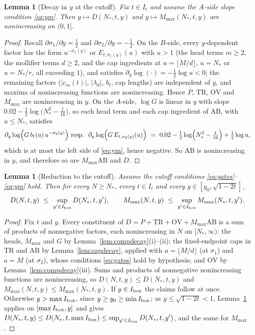 \documentclass[11pt]{article}
\newtheorem{lemma}[theorem]{Lemma}
\theoremstyle{definition}
\begin{document}
\begin{lemma}[Decay in $y$ at the cutoff]\label{lem:ydecay}
Fix $t\in I_t$ and assume the $A$-side slope condition
\eqref{eq:ym}. Then $y\mapsto D(N_*,t,y)$ and
$y\mapsto M_{\max}(N_*,t,y)$ are nonincreasing on $(0,1]$.
\end{lemma}

\begin{proof}
Recall $\partial\sigma_1/\partial y=\frac12$ and
$\partial\sigma_2/\partial y=-\frac12$. On the $B$-side, every
$y$-dependent factor has the form $u^{-\sigma_1(y)}$ or
$E_{t,\sigma_1(y)}(u)$ with $u>1$ (the head terms $m\ge2$, the
mollifier terms $d\ge2$, and the cap ingredients at
$u=\lfloor M/d\rfloor$, $u=N_*$ or $u=N_*/r$, all exceeding $1$),
and satisfies $\partial_y\log(\cdot)=-\frac12\log u<0$; the
remaining factors ($|c_m(t)|$, $|\lambda_d|$, $b_t$, cap lengths)
are independent of $y$, and maxima of nonincreasing functions are
nonincreasing. Hence $P$, $\mathrm{TR}$, $\mathrm{OV}$ and
$M_{\max}$ are nonincreasing in $y$. On the $A$-side, $\log G$ is
linear in $y$ with slope
$0.02-\frac12\log\bigl(N_*^2-\frac t{16}\bigr)$, so each head
term and each cap ingredient of $\mathrm{AB}$, with $u\le N_*$,
satisfies
\[
\partial_y\log\Bigl(G\,b_t(u)\,u^{-\sigma_2(y)}\Bigr)
\ \text{resp.}\ \
\partial_y\log\Bigl(G\,E_{t,\sigma_2(y)}(u)\Bigr)
\ =\ 0.02-\tfrac12\log\Bigl(N_*^2-\tfrac t{16}\Bigr)
+\tfrac12\log u,
\]
which is at most the left side of \eqref{eq:ym}, hence negative.
So $\mathrm{AB}$ is nonincreasing in $y$, and therefore so are
$M_{\max}\mathrm{AB}$ and $D$.
\end{proof}

\begin{lemma}[Reduction to the cutoff]\label{lem:reduction}
Assume the cutoff conditions \eqref{eq:gates}--\eqref{eq:ym} hold.
Then for every $N\ge N_*$, every $t\in I_t$ and every
$y\in[y_0,\sqrt{1-2t}]$,
\[
D(N,t,y)\ \le\ \sup_{y'\in I_{\rm box}}D(N_*,t,y'),
\qquad
M_{\max}(N,t,y)\ \le\ \sup_{y'\in I_{\rm box}}M_{\max}(N_*,t,y').
\]
\end{lemma}

\begin{proof}
Fix $t$ and $y$. Every constituent of
$D=P+\mathrm{TR}+\mathrm{OV}+M_{\max}\mathrm{AB}$ is a sum of
products of nonnegative factors, each nonincreasing in $N$ on
$[N_*,\infty)$: the heads, $M_{\max}$ and $G$ by
Lemma~\ref{lem:compdecay}(i)--(ii); the fixed-endpoint caps in
$\mathrm{TR}$ and $\mathrm{AB}$ by Lemma~\ref{lem:capdecay},
applied with $a=\lfloor M/d\rfloor$ (at $\sigma_1$) and $a=M$ (at
$\sigma_2$), whose conditions \eqref{eq:gates} hold by hypothesis;
and $\mathrm{OV}$ by Lemma~\ref{lem:compdecay}(iii). Sums and
products of nonnegative nonincreasing functions are nonincreasing,
so $D(N,t,y)\le D(N_*,t,y)$ and
$M_{\max}(N,t,y)\le M_{\max}(N_*,t,y)$. If $y\in I_{\rm box}$
the claims follow at once. Otherwise $y>\max I_{\rm box}$, since
$y\ge y_0\ge\min I_{\rm box}$; as $y\le\sqrt{1-2t}<1$,
Lemma~\ref{lem:ydecay} applies on $[\max I_{\rm box},y]$ and
gives $D(N_*,t,y)\le D(N_*,t,\max I_{\rm box})
\le\sup_{y'\in I_{\rm box}}D(N_*,t,y')$, and the same for
$M_{\max}$.
\end{proof}
\end{document}
